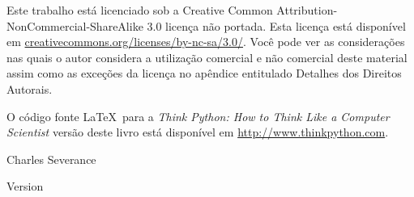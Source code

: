 \begin{latexonly}
{\vspace{0.2in}

Este trabalho está licenciado sob a Creative Common
Attribution-NonCommercial-ShareAlike 3.0 licença não portada. Esta licença
está disponível em \url{creativecommons.org/licenses/by-nc-sa/3.0/}.  Você
pode ver as considerações nas quais o autor considera a utilização comercial
e não comercial deste material assim como as exceções da licença no apêndice
entitulado Detalhes dos Direitos Autorais.


O código fonte \LaTeX\ para a \emph{Think Python: How to Think Like a Computer
Scientist} versão deste livro está disponível em \url{http://www.thinkpython.com}.


\vspace{0.2in}

} %

\end{latexonly}



\begin{htmlonly}


{\Large \thetitle}

{\large
Charles Severance}

Version \theversion

\setcounter{chapter}{-1}

\end{htmlonly}
